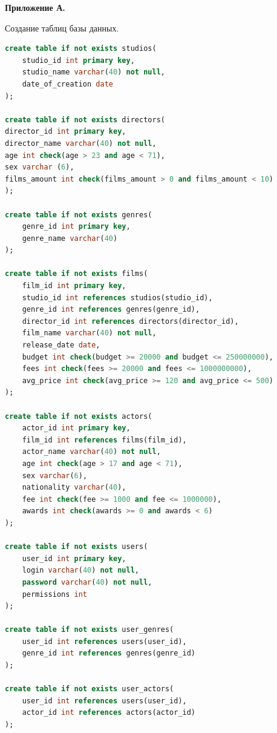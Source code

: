 \clearpage
{\centering\textbf{Приложение А.} \par}
{\centering Создание таблиц базы данных. \par}
\begin{lstlisting}[label={lst:appA}, language=SQL]
create table if not exists studios(
	studio_id int primary key,
	studio_name varchar(40) not null,
	date_of_creation date
);

create table if not exists directors(
director_id int primary key,
director_name varchar(40) not null,
age int check(age > 23 and age < 71),
sex varchar (6),
films_amount int check(films_amount > 0 and films_amount < 10)
);

create table if not exists genres(
	genre_id int primary key,
	genre_name varchar(40)
);

create table if not exists films(
	film_id int primary key,
	studio_id int references studios(studio_id),
	genre_id int references genres(genre_id),
	director_id int references directors(director_id),
	film_name varchar(40) not null,
	release_date date,
	budget int check(budget >= 20000 and budget <= 250000000),
	fees int check(fees >= 20000 and fees <= 1000000000),
	avg_price int check(avg_price >= 120 and avg_price <= 500)
);

create table if not exists actors(
	actor_id int primary key,
	film_id int references films(film_id),
	actor_name varchar(40) not null,
	age int check(age > 17 and age < 71),
	sex varchar(6),
	nationality varchar(40),
	fee int check(fee >= 1000 and fee <= 1000000),
	awards int check(awards >= 0 and awards < 6)
);

create table if not exists users(
	user_id int primary key,
	login varchar(40) not null,
	password varchar(40) not null,
	permissions int 
);

create table if not exists user_genres(
	user_id int references users(user_id),
	genre_id int references genres(genre_id)
);

create table if not exists user_actors(
	user_id int references users(user_id),
	actor_id int references actors(actor_id)
);
\end{lstlisting}


